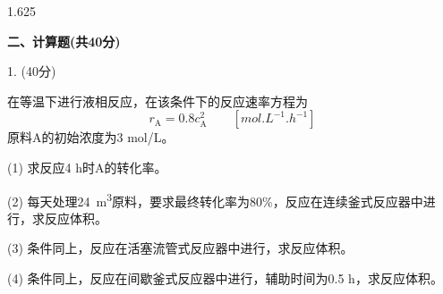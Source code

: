 \documentclass[12pt, b5paper]{article}
\begin{document}
\begin{spacing}{1.625}

\bigskip

{\bf{二、计算题(共40分)}}

1. (40分)

在等温下进行液相反应，在该条件下的反应速率方程为
\[
    r_\mathrm{A} = 0.8c_\mathrm{A}^2 \qquad [\si{mol.L^{-1}.h^{-1}}]
\]
原料A的初始浓度为3 mol/L。

(1) 求反应4 h时A的转化率。

(2) 每天处理\SI{24}{m^3}原料，要求最终转化率为80\%，反应在连续釜式反应器中进行，求反应体积。

(3) 条件同上，反应在活塞流管式反应器中进行，求反应体积。

(4) 条件同上，反应在间歇釜式反应器中进行，辅助时间为0.5 h，求反应体积。


\end{spacing}
\end{document}
